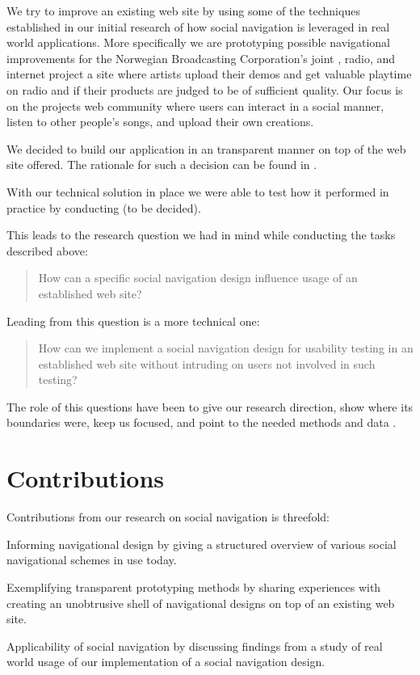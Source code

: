 We try to improve an existing web site by using some of the techniques
established in our initial research of how social navigation is leveraged
in real world applications. More specifically we are prototyping possible
navigational improvements for the Norwegian Broadcasting Corporation's joint
, radio, and internet project \project{\urort{}}\dash{}a site where
artists upload their demos and get valuable playtime on radio and  if
their products are judged to be of sufficient quality. Our focus is on the
projects web community%
where users can interact in a social manner, listen to other people's songs,
and upload their own creations.

We decided to build our application in an transparent manner on top of the
web site \urort{} offered. The rationale for such a decision can be found in
.

With our technical solution in place we were able to test how it performed in
practice by conducting  (to be decided).

This leads to the research question we had in mind while conducting
the tasks described above:

\begin{quote}
  How can a specific social navigation design influence usage of
  an established web site?
\end{quote}

Leading from this question is a more technical one:

\begin{quote}
  How can we implement a social navigation design for
  usability testing in an established web site without
  intruding on users not involved in such testing?
\end{quote}

The role of this questions have been to give our research direction, show
where its boundaries were, keep us focused, and point to the needed methods
and data \citep[]{silverman05}.


\section{Contributions}

Contributions from our research on social navigation is threefold:

\begin{enum}
  \item Informing navigational design by giving a structured overview of
    various social navigational schemes in use today.
  \item Exemplifying transparent prototyping methods by sharing experiences
    with creating an unobtrusive shell of navigational designs on top of an
    existing web site.
  \item Applicability of social navigation by discussing findings from
    a study of real world usage of our implementation of a social navigation
    design.
\end{enum}

